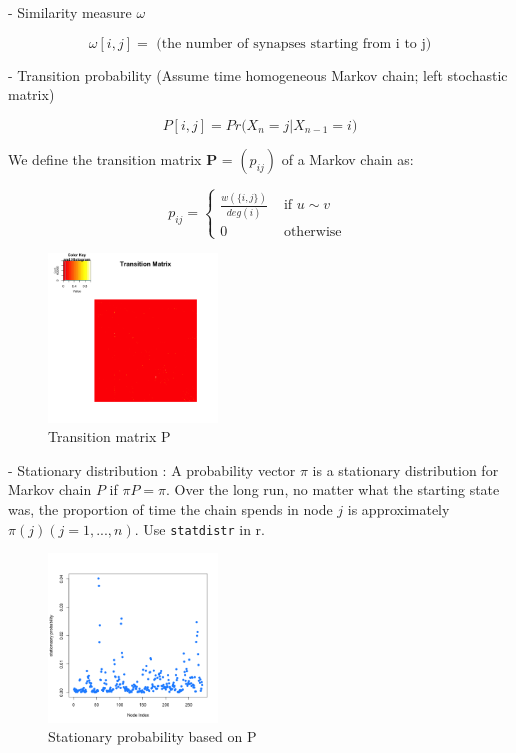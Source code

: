 \documentclass[12pt]{report}
\begin{document}
- Similarity measure $\omega$

$$\omega[i,j] = \mbox{ (the number of synapses starting from i to j)}$$
 

- Transition probability (Assume time homogeneous Markov chain; left stochastic matrix)

$$P[i,j] = Pr\big( X_{n} = j  | X_{n-1} = i \big)$$

We define the transition matrix \textbf{P} = $(p_{ij})$ of a Markov chain as:

$$p_{ij} = \left\{ \begin{array}{ll} \frac{w(\{ i, j\})}{ deg(i) } & \mbox{ if } u \sim v \\ 0 & \mbox{ otherwise }  \end{array}  \right.$$


\begin{figure}[H]
\captionsetup{format=plain}
\centering
\includegraphics[width=0.4\textwidth]{../figure/trans.png}
\caption{Transition matrix P}
\label{fig:trans}
\end{figure}



- Stationary distribution 
: A probability vector $\pi$ is a stationary distribution for Markov chain $P$ if $\pi P = \pi$. Over the long run, no matter what the starting state was, the proportion of time the chain spends in node $j$ is approximately $\pi(j) (j = 1, ... , n)$.
Use \verb!statdistr! in r.


\begin{figure}[H]
\captionsetup{format=plain}
\centering
\includegraphics[width=0.4\textwidth]{../figure/statd.png}
\caption{Stationary probability based on P}
\label{fig:statd}
\end{figure}
\end{document}

